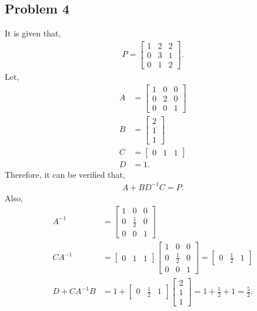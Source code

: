 \subsection*{Problem 4}
It is given that,
\begin{align*}
	P = \begin{bmatrix}1 & 2 & 2\\0 & 3 & 1\\0 & 1 & 2\end{bmatrix}.
\end{align*}
Let,
\begin{align*}
	A &= \begin{bmatrix}1 & 0 & 0\\0 & 2 & 0\\0 & 0 & 1\end{bmatrix}\\
	B &= \begin{bmatrix}2\\1\\1\end{bmatrix}\\
	C &= \begin{bmatrix}0 & 1 & 1\end{bmatrix}\\
	D &= 1.
\end{align*}
Therefore, it can be verified that,
\begin{align*}
	A+BD^{-1}C = P.
\end{align*}
Also,
\begin{align*}
	A^{-1} &= \begin{bmatrix}1 & 0 & 0\\0 & \frac{1}{2} & 0\\0 & 0 & 1\end{bmatrix}\\
	CA^{-1} &= \begin{bmatrix}0 & 1 & 1\end{bmatrix}\begin{bmatrix}1 & 0 & 0\\0 & \frac{1}{2} & 0\\0 & 0 & 1\end{bmatrix} = \begin{bmatrix}0 & \frac{1}{2} & 1\end{bmatrix}\\
	D+CA^{-1}B &= 1+\begin{bmatrix}0 & \frac{1}{2} & 1\end{bmatrix}\begin{bmatrix}2\\1\\1\end{bmatrix} = 1+\frac{1}{2}+1 = \frac{5}{2}.
\end{align*}
